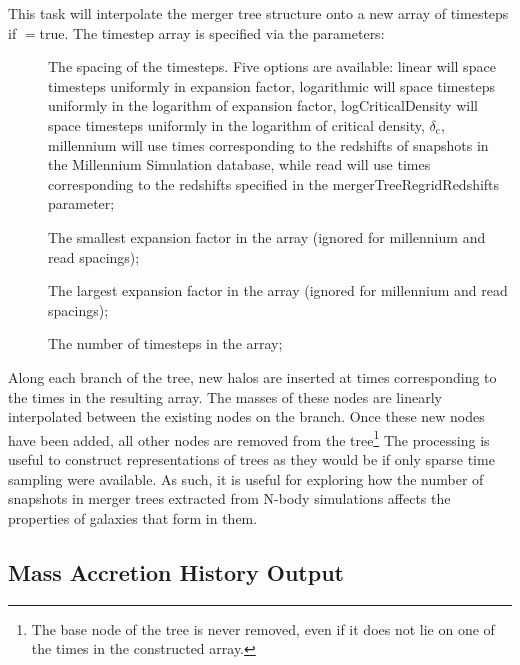 This task will interpolate the merger tree structure onto a new array of timesteps if {\normalfont \ttfamily [mergerTreeRegridTimes]}$=${\normalfont \ttfamily true}. The timestep array is specified via the parameters:
\begin{description}
\item[{\normalfont \ttfamily [mergerTreeRegridSpacing]}] The spacing of the timesteps. Five options are available: {\normalfont \ttfamily linear} will space timesteps uniformly in expansion factor, {\normalfont \ttfamily logarithmic} will space timesteps uniformly in the logarithm of expansion factor, {\normalfont \ttfamily logCriticalDensity} will space timesteps uniformly in the logarithm of critical density, $\delta_{\mathrm c}$, {\normalfont \ttfamily millennium} will use times corresponding to the redshifts of snapshots in the Millennium Simulation database, while {\normalfont \ttfamily read} will use times corresponding to the redshifts specified in the {\normalfont \ttfamily mergerTreeRegridRedshifts} parameter;
\item[{\normalfont \ttfamily [mergerTreeRegridStartExpansionFactor]}] The smallest expansion factor in the array (ignored for {\normalfont \ttfamily millennium} and {\normalfont \ttfamily read} spacings);
\item[{\normalfont \ttfamily [mergerTreeRegridEndExpansionFactor]}] The largest expansion factor in the array (ignored for {\normalfont \ttfamily millennium} and {\normalfont \ttfamily read} spacings);
\item[{\normalfont \ttfamily [mergerTreeRegridCount]}] The number of timesteps in the array;
\end{description}
Along each branch of the tree, new halos are inserted at times corresponding to the times in the resulting array. The masses of these nodes are linearly interpolated between the existing nodes on the branch. Once these new nodes have been added, all other nodes are removed from the tree\footnote{The base node of the tree is never removed, even if it does not lie on one of the times in the constructed array.} The processing is useful to construct representations of trees as they would be if only sparse time sampling were available. As such, it is useful for exploring how the number of snapshots in merger trees extracted from N-body simulations affects the properties of galaxies that form in them.

\subsection{Mass Accretion History Output}

